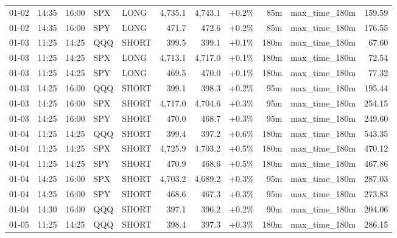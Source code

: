 \documentclass[11pt,a4paper,twoside]{article}
\begin{document}
\begin{center}
\begin{longtable}{>{\color{txtmain}}l l l l l r r r r >{\color{txtmain}}l r}
01-02 & 14:35 & 16:00 & SPX & LONG & 4,735.1 & 4,743.1 & \textcolor{wingreen}{+0.2\%} & 85m & max\_time\_180m & \textcolor{wingreen}{159.59} \\
01-02 & 14:35 & 16:00 & SPY & LONG & 471.7 & 472.6 & \textcolor{wingreen}{+0.2\%} & 85m & max\_time\_180m & \textcolor{wingreen}{176.55} \\
01-03 & 11:25 & 14:25 & QQQ & SHORT & 399.5 & 399.1 & \textcolor{wingreen}{+0.1\%} & 180m & max\_time\_180m & \textcolor{wingreen}{67.60} \\
01-03 & 11:25 & 14:25 & SPX & LONG & 4,713.1 & 4,717.0 & \textcolor{wingreen}{+0.1\%} & 180m & max\_time\_180m & \textcolor{wingreen}{72.54} \\
01-03 & 11:25 & 14:25 & SPY & LONG & 469.5 & 470.0 & \textcolor{wingreen}{+0.1\%} & 180m & max\_time\_180m & \textcolor{wingreen}{77.32} \\
01-03 & 14:25 & 16:00 & QQQ & SHORT & 399.1 & 398.3 & \textcolor{wingreen}{+0.2\%} & 95m & max\_time\_180m & \textcolor{wingreen}{195.44} \\
01-03 & 14:25 & 16:00 & SPX & SHORT & 4,717.0 & 4,704.6 & \textcolor{wingreen}{+0.3\%} & 95m & max\_time\_180m & \textcolor{wingreen}{254.15} \\
01-03 & 14:25 & 16:00 & SPY & SHORT & 470.0 & 468.7 & \textcolor{wingreen}{+0.3\%} & 95m & max\_time\_180m & \textcolor{wingreen}{249.60} \\
01-04 & 11:25 & 14:25 & QQQ & SHORT & 399.4 & 397.2 & \textcolor{wingreen}{+0.6\%} & 180m & max\_time\_180m & \textcolor{wingreen}{543.35} \\
01-04 & 11:25 & 14:25 & SPX & SHORT & 4,725.9 & 4,703.2 & \textcolor{wingreen}{+0.5\%} & 180m & max\_time\_180m & \textcolor{wingreen}{470.12} \\
01-04 & 11:25 & 14:25 & SPY & SHORT & 470.9 & 468.6 & \textcolor{wingreen}{+0.5\%} & 180m & max\_time\_180m & \textcolor{wingreen}{467.86} \\
01-04 & 14:25 & 16:00 & SPX & SHORT & 4,703.2 & 4,689.2 & \textcolor{wingreen}{+0.3\%} & 95m & max\_time\_180m & \textcolor{wingreen}{287.03} \\
01-04 & 14:25 & 16:00 & SPY & SHORT & 468.6 & 467.3 & \textcolor{wingreen}{+0.3\%} & 95m & max\_time\_180m & \textcolor{wingreen}{273.83} \\
01-04 & 14:30 & 16:00 & QQQ & SHORT & 397.1 & 396.2 & \textcolor{wingreen}{+0.2\%} & 90m & max\_time\_180m & \textcolor{wingreen}{204.06} \\
01-05 & 11:25 & 14:25 & QQQ & SHORT & 398.4 & 397.3 & \textcolor{wingreen}{+0.3\%} & 180m & max\_time\_180m & \textcolor{wingreen}{286.15} \\

\end{longtable}
\end{center}
\end{document}

